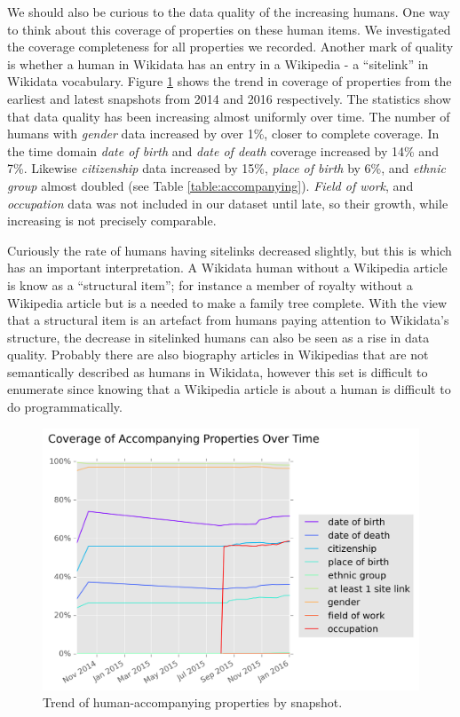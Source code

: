 \documentclass[letterpaper]{article}
\begin{document}
We should also be curious to the data quality of the increasing humans. One way to think about this coverage of properties on these human items. We investigated the coverage completeness for all  properties we recorded. Another mark of quality is whether a human in Wikidata has an entry in a Wikipedia - a ``sitelink'' in Wikidata vocabulary. Figure \ref{fig:accompanying} shows the trend in coverage of properties from the earliest and latest snapshots from 2014 and 2016 respectively. The statistics show that data quality has been increasing almost uniformly over time. The number of humans with \textit{gender} data increased by over 1\%, closer to complete coverage. In the time domain \textit{date of birth} and \textit{date of death} coverage increased by 14\% and 7\%. Likewise \textit{citizenship} data increased by 15\%, \textit{place of birth} by 6\%, and \textit{ethnic group} almost doubled (see Table \ref{table:accompanying}). \textit{Field of work}, and \textit{occupation} data was not included in our dataset until late, so their growth, while increasing is not precisely comparable.

Curiously the rate of humans having sitelinks decreased slightly, but this is which has an important interpretation. A Wikidata human without a Wikipedia article is know as a ``structural item''; for instance a member of royalty without a Wikipedia article but is a needed to make a family tree complete. With the view that a structural item is an artefact from humans paying attention to Wikidata's structure, the decrease in sitelinked humans can also be seen as a rise in data quality. Probably there are also biography articles in Wikipedias that are not semantically described as humans in Wikidata, however this set is difficult to enumerate since knowing that a Wikipedia article is about a human is difficult to do programmatically. 


\begin{figure}
\label{fig:accompanying}
\includegraphics[scale=0.5]{figures/additionalprops.png} 
\caption{Trend of human-accompanying properties by snapshot.}
\end{figure}
\end{document}
